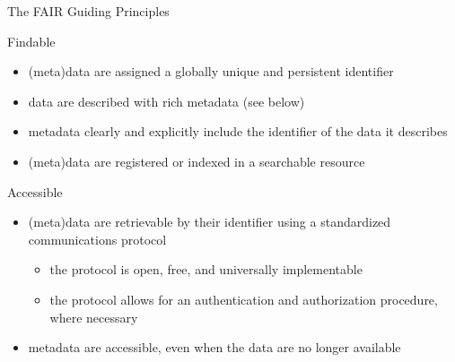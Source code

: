 \documentclass[ignorenonframetext,aspectratio=169,10pt,xcolor=table]{beamer}
\begin{document}
\begin{frame}{The FAIR Guiding Principles}
  \begin{block}{Findable}
    \begin{itemize}
    \item (meta)data are assigned a globally unique and persistent identifier
    \item data are described with rich metadata (see below)
    \item metadata clearly and explicitly include the identifier of the data it describes
    \item (meta)data are registered or indexed in a searchable resource
    \end{itemize}
  \end{block}

  \begin{block}{Accessible}
    \begin{itemize}
    \item (meta)data are retrievable by their identifier using a standardized communications protocol
      \begin{itemize}
      \item the protocol is open, free, and universally implementable
      \item the protocol allows for an authentication and authorization procedure, where necessary
      \end{itemize}
    \item metadata are accessible, even when the data are no longer available
    \end{itemize}
  \end{block}

\end{frame}
\end{document}
